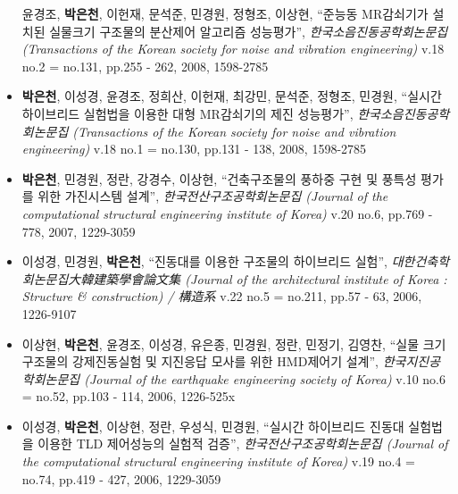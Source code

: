 \begin{itemize}
  윤경조, \textbf{박은천}, 이헌재, 문석준, 민경원, 정형조, 이상현,
  ``준능동 MR감쇠기가 설치된 실물크기 구조물의 분산제어 알고리즘
  성능평가'', \emph{한국소음진동공학회논문집 (Transactions of the Korean
  society for noise and vibration engineering)} v.18 no.2 = no.131,
  pp.255 - 262, 2008, 1598-2785
\item[]
  \textbf{박은천}, 이성경, 윤경조, 정희산, 이헌재, 최강민, 문석준,
  정형조, 민경원, ``실시간 하이브리드 실험법을 이용한 대형 MR감쇠기의
  제진 성능평가'', \emph{한국소음진동공학회논문집 (Transactions of the
  Korean society for noise and vibration engineering)} v.18 no.1 =
  no.130, pp.131 - 138, 2008, 1598-2785
\item[]
  \textbf{박은천}, 민경원, 정란, 강경수, 이상현, ``건축구조물의 풍하중
  구현 및 풍특성 평가를 위한 가진시스템 설계'',
  \emph{한국전산구조공학회논문집 (Journal of the computational
  structural engineering institute of Korea)} v.20 no.6, pp.769 - 778,
  2007, 1229-3059
\item[]
  이성경, 민경원, \textbf{박은천}, ``진동대를 이용한 구조물의 하이브리드
  실험'', \emph{대한건축학회논문집大韓建築學會論文集 (Journal of the
  architectural institute of Korea : Structure \& construction) /
  構造系} v.22 no.5 = no.211, pp.57 - 63, 2006, 1226-9107
\item[]
  이상현, \textbf{박은천}, 윤경조, 이성경, 유은종, 민경원, 정란, 민정기,
  김영찬, ``실물 크기 구조물의 강제진동실험 및 지진응답 모사를 위한
  HMD제어기 설계'', \emph{한국지진공학회논문집 (Journal of the
  earthquake engineering society of Korea)} v.10 no.6 = no.52, pp.103 -
  114, 2006, 1226-525x
\item[]
  이성경, \textbf{박은천}, 이상현, 정란, 우성식, 민경원, ``실시간
  하이브리드 진동대 실험법을 이용한 TLD 제어성능의 실험적 검증'',
  \emph{한국전산구조공학회논문집 (Journal of the computational
  structural engineering institute of Korea)} v.19 no.4 = no.74, pp.419
  - 427, 2006, 1229-3059
\end{itemize}

